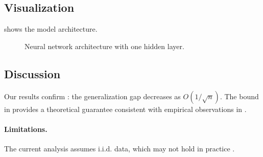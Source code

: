 \subsection{Visualization}

 shows the model architecture.

\begin{figure}[htbp]
\centering
{}
\caption{Neural network architecture with one hidden layer.}
\label{fig:architecture}
\end{figure}

\subsection{Discussion}

Our results confirm : the generalization gap
decreases as $O(1/\sqrt{n})$. The bound in 
provides a theoretical guarantee consistent with empirical
observations in .

\paragraph{Limitations.} The current analysis assumes i.i.d. data,
which may not hold in practice \cite{bishop2006}.
